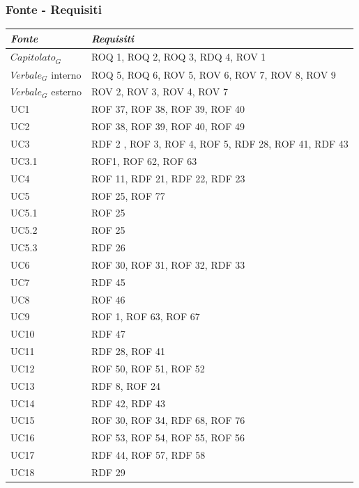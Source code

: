 \documentclass[12pt, oneside]{article}
\begin{document}
\subsubsection{Fonte - Requisiti}
\begin{longtable}{|p{4cm}|p{12cm}|}
    \hline
    \emph{Fonte} & \emph{Requisiti}\\
    \hline
    \endfirsthead
    \endhead
    $\textit{Capitolato}_G$ & ROQ 1, ROQ 2, ROQ 3, RDQ 4, ROV 1 \\
    \hline
    $\textit{Verbale}_G$ interno & ROQ 5, ROQ 6, ROV 5, ROV 6, ROV 7, ROV 8, ROV 9 \\
    \hline
    $\textit{Verbale}_G$ esterno & ROV 2, ROV 3, ROV 4, ROV 7 \\
    \hline
    UC1 & ROF 37, ROF 38, ROF 39, ROF 40 \\
    \hline
    UC2 & ROF 38, ROF 39, ROF 40, ROF 49  \\
    \hline
    UC3 & RDF 2 , ROF 3, ROF 4, ROF 5, RDF 28, ROF 41, RDF 43 \\
    \hline 
    UC3.1 & ROF1, ROF 62, ROF 63 \\
    \hline
    UC4 & ROF 11, RDF 21, RDF 22, RDF 23 \\
    \hline
    UC5 & ROF 25, ROF 77 \\
    \hline
    UC5.1 & ROF 25 \\
    \hline
    UC5.2 & ROF 25 \\
    \hline
    UC5.3 & RDF 26 \\
    \hline
    UC6 & ROF 30, ROF 31, ROF 32, RDF 33 \\
    \hline
    UC7 & RDF 45  \\
    \hline
    UC8 & ROF 46 \\
    \hline
    UC9 & ROF 1, ROF 63, ROF 67 \\
    \hline
    UC10 & RDF 47 \\
    \hline
    UC11 & RDF 28, ROF 41 \\
    \hline
    UC12 & ROF 50, ROF 51, ROF 52 \\
    \hline
    UC13 & RDF 8, ROF 24 \\
    \hline
    UC14 & RDF 42, RDF 43 \\
    \hline
    UC15 & ROF 30, ROF 34, RDF 68, ROF 76 \\
    \hline
    UC16 & ROF 53, ROF 54, ROF 55, ROF 56 \\
    \hline
    UC17 & RDF 44, ROF 57, RDF 58 \\
    \hline
    UC18 & RDF 29 \\

\end{longtable}
\end{document}
